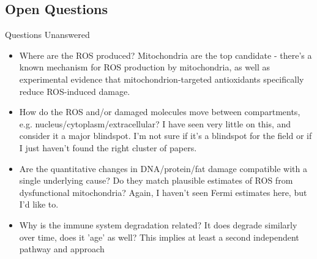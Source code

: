 \subsection{Open Questions}

\begin{frame}[c]{Questions Unanswered}
    \begin{itemize}[<+(1)->]
        \item Where are the ROS produced? Mitochondria are the top candidate - there’s a known mechanism for ROS production by mitochondria, as well as experimental evidence that mitochondrion-targeted antioxidants specifically reduce ROS-induced damage.
        \item How do the ROS and/or damaged molecules move between compartments, e.g. nucleus/cytoplasm/extracellular? I have seen very little on this, and consider it a major blindspot. I’m not sure if it’s a blindspot for the field or if I just haven’t found the right cluster of papers.
        \item Are the quantitative changes in DNA/protein/fat damage compatible with a single underlying cause? Do they match plausible estimates of ROS from dysfunctional mitochondria? Again, I haven’t seen Fermi estimates here, but I’d like to.
        \item Why is the immune system degradation related? It does degrade similarly over time, does it 'age' as well? This implies at least a second independent pathway and approach
    \end{itemize}
\end{frame}
